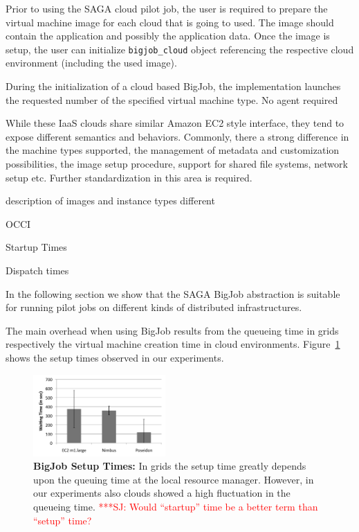 \documentclass[conference,final]{IEEEtran}
\newcommand{\jhanote}[1]{ {\textcolor{red} { ***SJ: #1 }}}
\newcommand{\jhanote}[1]{}
\begin{document}
Prior to using the SAGA cloud pilot job, the user is required to
prepare the virtual machine image for each cloud that is going to
used. The image should contain the application and possibly the
application data. Once the image is setup, the user can initialize
\texttt{bigjob\_cloud} object referencing the respective cloud
environment (including the used image).

During the initialization of a cloud based BigJob, the implementation
launches the requested number of the specified virtual machine type.
No agent required

While these IaaS clouds share similar Amazon EC2 style interface, they
tend to expose different semantics and behaviors. Commonly, there a
strong difference in the machine types supported, the management of
metadata and customization possibilities, the image setup procedure,
support for shared file systems, network setup etc. Further
standardization in this area is required.


description of images and instance types different

OCCI


Startup Times

Dispatch times

In the following section we show that the SAGA BigJob abstraction is
suitable for running pilot jobs on different kinds of distributed
infrastructures.

The main overhead when using BigJob results from the queueing time in grids respectively the virtual 
machine creation time in cloud environments. Figure~\ref{fig:performance_setup_time} shows the setup
times observed in our experiments. 
\begin{figure}[htbp]
    \centering
        \includegraphics[width=0.45\textwidth]{performance/setup_time_xls.pdf}
    \caption{\textbf{BigJob Setup Times:} In grids the setup time
      greatly depends upon the queuing time at the local resource
      manager. However, in our experiments also clouds showed a high
      fluctuation in the queueing time. \jhanote{Would ``startup''
        time be a better term than ``setup'' time?}}
    \label{fig:performance_setup_time}
\end{figure}
\end{document}
